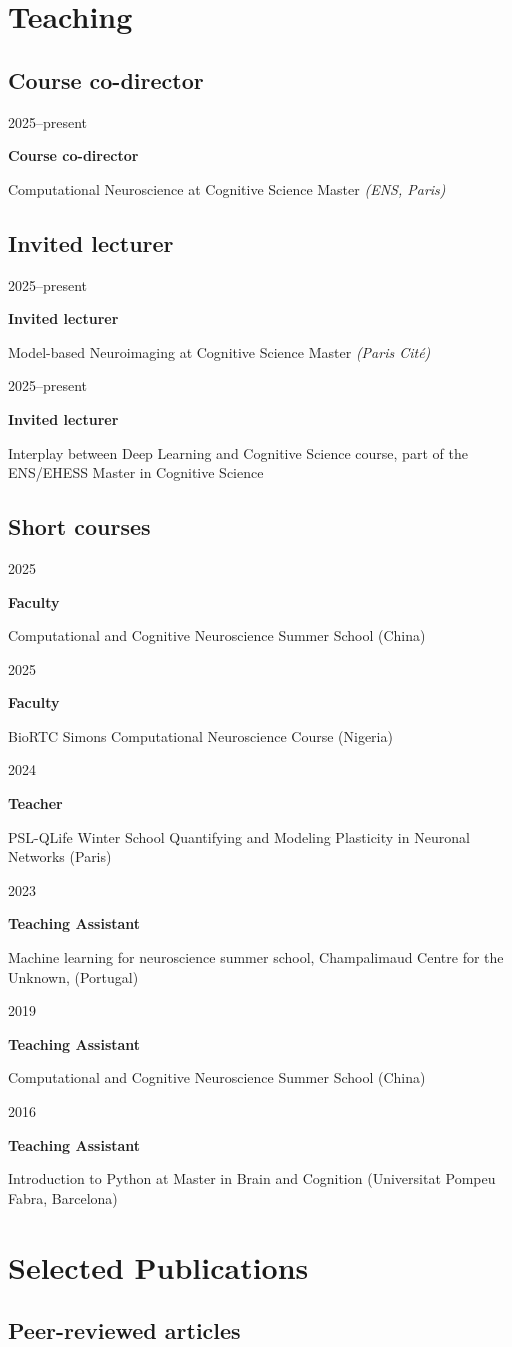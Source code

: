 \documentclass[11pt,a4paper]{article}
\newcommand{\cventry}[4]{
\noindent
\begin{minipage}[t]{0.15\textwidth}
\raggedright #1
\end{minipage}%
\begin{minipage}[t]{0.15\textwidth}
\raggedright \textbf{#2}
\end{minipage}%
\begin{minipage}[t]{0.7\textwidth}
\raggedright #3 \textit{#4}
\end{minipage}
\vspace{3pt}
}
\begin{document}
\section{Teaching}

\subsection{Course co-director}
\cventry{2025--present}{Course co-director}{Computational Neuroscience at Cognitive Science Master}{(ENS, Paris)}

\subsection{Invited lecturer}
\cventry{2025--present}{Invited lecturer}{Model-based Neuroimaging at Cognitive Science Master}{(Paris Cité)}

\cventry{2025--present}{Invited lecturer}{Interplay between Deep Learning and Cognitive Science course, part of the ENS/EHESS Master in Cognitive Science}{}

\subsection{Short courses}
\cventry{2025}{Faculty}{Computational and Cognitive Neuroscience Summer School (China)}{}

\cventry{2025}{Faculty}{BioRTC Simons Computational Neuroscience Course (Nigeria)}{}

\cventry{2024}{Teacher}{PSL-QLife Winter School Quantifying and Modeling Plasticity in Neuronal Networks (Paris)}{}

\cventry{2023}{Teaching Assistant}{Machine learning for neuroscience summer school, Champalimaud Centre for the Unknown, (Portugal)}{}

\cventry{2019}{Teaching Assistant}{Computational and Cognitive Neuroscience Summer School (China)}{}

\cventry{2016}{Teaching Assistant}{Introduction to Python at Master in Brain and Cognition (Universitat Pompeu Fabra, Barcelona)}{}

\section{Selected Publications}

\subsection{Peer-reviewed articles}
\end{document}
